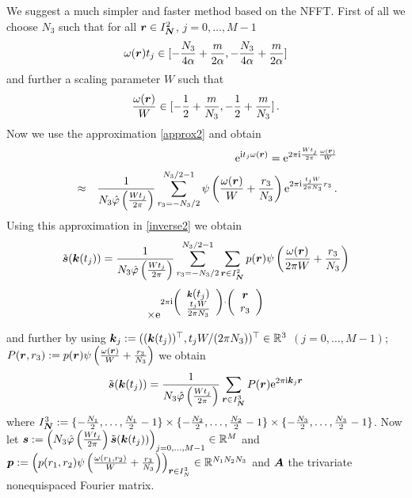 \documentclass[journal]{IEEEtran}
\def\ti{\mbox{\scriptsize{\rm i}}}
\newcommand{\eip}[1]{{\rm e}^{ 2\pi{\ti} #1}}
\newcommand{\zb}[1]{\mbox{\boldmath{${#1}$}}}
\newcommand{\zbs}[1]{\mbox{\boldmath\scriptsize{${#1}$}}}
\newcommand{\zbss}[1]{\mbox{\boldmath\tiny{${#1}$}}}
\numberwithin{equation}{section}
\numberwithin{table}{section}
\numberwithin{figure}{section}
\begin{document}
We suggest a much simpler and faster method based on the NFFT.
First of all we choose $N_3$ such that 
for all $\zb r\in I_{\zbs N}^2$, $j=0,\ldots,M-1$
\begin{equation}\label{wahlN3}
\omega(\zb r)t_j
\in[-\frac{N_3}{4\alpha}+\frac{m}{2\alpha},-\frac{N_3}{4\alpha}+\frac{m}{2\alpha}] 
\end{equation}
and further a scaling parameter $W$ such that
\[
\frac{\omega(\zb r)}{W}
\in[-\frac{1}{2}+\frac{m}{N_3},-\frac{1}{2}+\frac{m}{N_3}]\, . 
\]
Now we use the approximation \eqref{approx2} and obtain
\begin{eqnarray} \label{appr_inh}
&&{\rm e}^{\ti t_j \omega(\zbs r)}  =
\eip{\frac{W t_j}{2\pi} \frac{\omega(\zbss r)}{W}}\\ \nonumber
&\approx&
\frac{1}{N_3\hat\varphi\left(\frac{Wt_j}{2\pi}\right)}
\sum_{r_3=-N_3/2}^{N_3/2-1} \psi \left(\frac{\omega(\zb
  r)}{W}+\frac{r_3}{N_3}\right)  \eip{\frac{t_jW}{2\pi N_3}r_3}\, .
\end{eqnarray}
Using this approximation in \eqref{inverse2} we obtain
\begin{equation*}
\tilde{\zb s}(\zb k(t_j))=
\frac{1}{N_3 \hat\varphi\left(\frac{Wt_j}{2\pi}\right)}
\sum_{r_3=-N_3/2}^{N_3/2-1}
\sum_{\zbs r \in I^2_{\zbss N}} 
p(\zb r) \psi \left(\frac{\omega(\zb r)}{2\pi W}+\frac{r_3}{N_3}\right)
\end{equation*}
\begin{equation*}
\times \eip{\left(\begin{array}{c}
\zbs k(t_j)\\
\frac{t_jW}{2\pi N_3}
\end{array}\right)
\cdot
\left(\begin{array}{c}
\zb r\\
r_3
\end{array}\right)
}
\end{equation*}
and further by using $\zb k_j:= ((\zb k(t_j))^{\top},
  t_jW/(2\pi N_3))^{\top}\in \mathbb{R}^3$ $(j=0,\ldots, M-1)$;
$P(\zb r,r_3):= p(\zb r) \psi \left(\frac{\omega(\zbs
  r)}{W}+\frac{r_3}{N_3}\right)$ 
we obtain
\begin{equation*}
\tilde{\zb s}(\zb k(t_j))=
\frac{1}{N_3 \hat\varphi\left(\frac{Wt_j}{2\pi}\right)}
\sum_{\zbs r \in I^3_{\zbss N}} 
P(\zb r) \eip{\zbs k_j\zbs r}
\end{equation*}
where $I^3_{\zbs N} :=
\{-\frac{N_1}{2},\dots,\frac{N_1}{2}-1\}\times\{-\frac{N_2}{2},\dots,
\frac{N_2}{2}-1\}\times\{-\frac{N_3}{2},\dots,\frac{N_3}{2}-1\}$.
Now let
$\zb s:=\left(N_3 \hat\varphi\left(\frac{Wt_j}{2\pi}\right)\tilde{\zb s}(\zb
  k(t_j))\right)_{j=0,\ldots, M-1}\in \mathbb{R}^M
$
and
$
\zb p :=\left(p(r_1,r_2) \psi \left(\frac{\omega(r_1,r_2)}{W}+\frac{r_3}{N_3}\right)\right)_{\zbs r\in I_N^3}\in
\mathbb{R}^{N_1N_2N_3}
$
and $\zb A$ the trivariate nonequispaced Fourier matrix.
\end{document}
